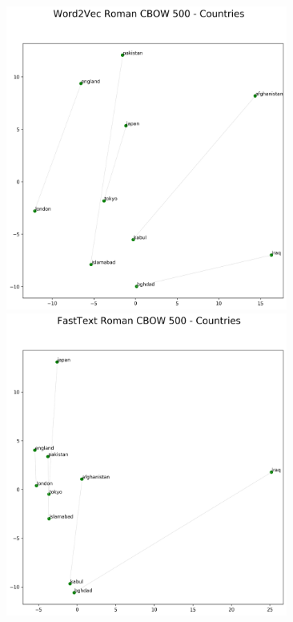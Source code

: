 \documentclass[format=acmsmall,review=true,screen=true]{acmart}
\begin{document}
\includegraphics[width=10cm,height=10cm,keepaspectratio]{word2vec-cbow_roman-urdu_countries.png} \\
\includegraphics[width=10cm,height=10cm,keepaspectratio]{fasttext-cbow_roman-urdu_countries.png} \\
\end{document}
